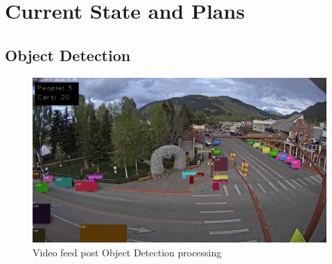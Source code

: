 \documentclass[onecolumn, draftclsnofoot,10pt, compsoc]{IEEEtran}
\begin{document}
\section{Current State and Plans}
\subsection{Object Detection}

\begin{figure}[!htb]
\caption{Video feed post Object Detection processing}
\centerline{\includegraphics[width=\textwidth]{ObjDetectFig.png}}
\label{fig:objdet}
\end{figure}
\end{document}
